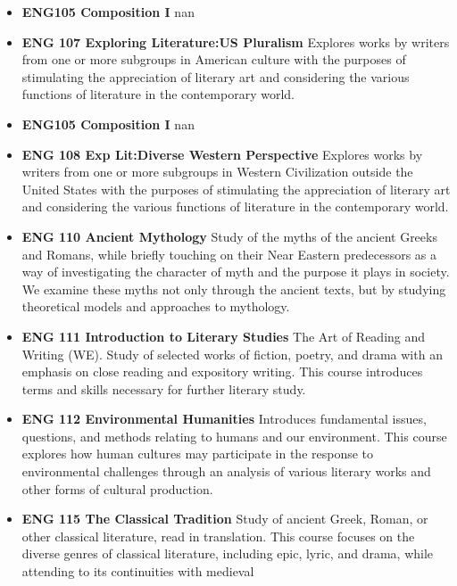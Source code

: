 \documentclass[
  letterpaper,
]{scrbook}
\providecommand{\tightlist}{%
  \setlength{\itemsep}{0pt}\setlength{\parskip}{0pt}}
\begin{document}
\begin{itemize}
\tightlist
\item
  \textbf{ENG105 Composition I} nan\\
\item
  \textbf{ENG 107 Exploring Literature:US Pluralism} Explores works by
  writers from one or more subgroups in American culture with the
  purposes of stimulating the appreciation of literary art and
  considering the various functions of literature in the contemporary
  world.\\
\item
  \textbf{ENG105 Composition I} nan\\
\item
  \textbf{ENG 108 Exp Lit:Diverse Western Perspective} Explores works by
  writers from one or more subgroups in Western Civilization outside the
  United States with the purposes of stimulating the appreciation of
  literary art and considering the various functions of literature in
  the contemporary world.\\
\item
  \textbf{ENG 110 Ancient Mythology} Study of the myths of the ancient
  Greeks and Romans, while briefly touching on their Near Eastern
  predecessors as a way of investigating the character of myth and the
  purpose it plays in society. We examine these myths not only through
  the ancient texts, but by studying theoretical models and approaches
  to mythology.\\
\item
  \textbf{ENG 111 Introduction to Literary Studies} The Art of Reading
  and Writing (WE). Study of selected works of fiction, poetry, and
  drama with an emphasis on close reading and expository writing. This
  course introduces terms and skills necessary for further literary
  study.\\
\item
  \textbf{ENG 112 Environmental Humanities} Introduces fundamental
  issues, questions, and methods relating to humans and our environment.
  This course explores how human cultures may participate in the
  response to environmental challenges through an analysis of various
  literary works and other forms of cultural production.\\
\item
  \textbf{ENG 115 The Classical Tradition} Study of ancient Greek,
  Roman, or other classical literature, read in translation. This course
  focuses on the diverse genres of classical literature, including epic,
  lyric, and drama, while attending to its continuities with medieval

\end{itemize}
\end{document}
